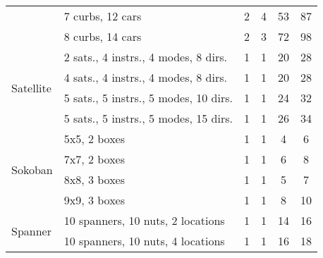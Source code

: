 \documentclass{article}
\begin{document}
\begin{table}[bt!]
{\begin{tabular}{ll|cc|cc}
                                & 7 curbs, 12 cars                  & 2                       & 4                        & 53                      & 87                       \\
                                & 8 curbs, 14 cars                  & 2                       & 3                        & 72                      & 98                       \\ \midrule
\multirow{4}{*}{Satellite}     & 2 sats., 4 instrs., 4 modes, 8 dirs.                      & 1                       & 1                        & 20                       & 28                        \\
                                & 4 sats., 4 instrs., 4 modes, 8 dirs.                        & 1                       & 1                        & 20                       & 28                        \\
                                & 5 sats., 5 instrs., 5 modes, 10 dirs.                        & 1                       & 1                        & 24                       & 32                        \\
                                & 5 sats., 5 instrs., 5 modes, 15 dirs.                      & 1                       & 1                        & 26                       & 34                       \\ \midrule\multirow{4}{*}{Sokoban}& 5x5, 2 boxes                      & 1                       & 1                        & 4                       & 6                        \\
                                & 7x7, 2 boxes                      & 1                       & 1                        & 6                       & 8                        \\
                                & 8x8, 3 boxes                      & 1                       & 1                        & 5                       & 7                        \\
                                & 9x9, 3 boxes                      & 1                       & 1                        & 8                       & 10                       \\ \midrule
\multirow{9}{*}{Spanner}     & 10 spanners, 10 nuts, 2 locations & 1                       & 1                        & 14                      & 16                       \\
                                & 10 spanners, 10 nuts, 4 locations & 1                       & 1                        & 16                      & 18                       \\

\end{tabular}}
\end{table}
\end{document}
